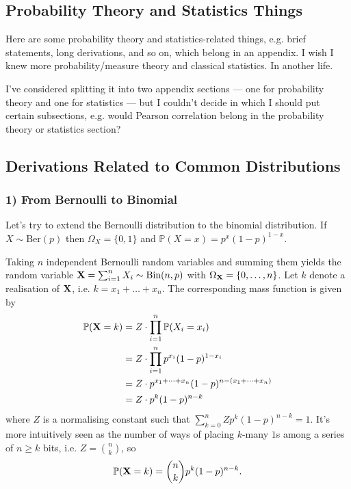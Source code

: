 \documentclass[11pt]{article}
\begin{document}
\newpage
\begin{appendices}

\section{Probability Theory and Statistics Things}
Here are some probability theory and statistics-related things, e.g. brief statements, long derivations, and so on, which belong in an appendix. I wish I knew more probability/measure theory and classical statistics. In another life.

I've considered splitting it into two appendix sections — one for probability theory and one for statistics — but I couldn't decide in which I should put certain subsections, e.g. would Pearson correlation belong in the probability theory or statistics section?

\subsection{Derivations Related to Common Distributions}

\subsubsection*{1) From Bernoulli to Binomial}
Let's try to extend the Bernoulli distribution to the binomial distribution. If $X\sim\text{Ber}(p)$ then $\Omega_X=\{0,1\}$ and $\mathbb{P}(X=x)=p^x(1-p)^{1-x}$.

Taking $n$ independent Bernoulli random variables and summing them yields the random variable $\mathbf{X}=\sum_{i=1}^nX_i\sim\text{Bin}(n,p)$ with $\Omega_{\mathbf{X}}=\{0,\dots,n\}$. Let $k$ denote a realisation of $\mathbf{X}$, i.e. $k=x_1+\dots+x_n$. The corresponding mass function is given by
\begin{align*}
    \mathbb{P}(\mathbf{X}=k)
    &=
    Z\cdot\prod_{i=1}^n\mathbb{P}(X_i=x_i)\\
    &=
    Z\cdot\prod_{i=1}^np^{x_i}(1-p)^{1-x_i}\\
    &=
    Z\cdot p^{x_1+\dots+x_n}(1-p)^{n-(x_1+\dots+x_n)}\\
    &=
    Z\cdot p^k(1-p)^{n-k}
\end{align*}
where $Z$ is a normalising constant such that $\sum_{k=0}^nZp^k(1-p)^{n-k}=1$. It's more intuitively seen as the number of ways of placing $k$-many $1$s among a series of $n\geq k$ bits, i.e. $Z=\binom{n}{k}$, so
$$
\mathbb{P}(\mathbf{X}=k)
=
\binom{n}{k}p^k(1-p)^{n-k}.
$$


\end{appendices}
\end{document}
